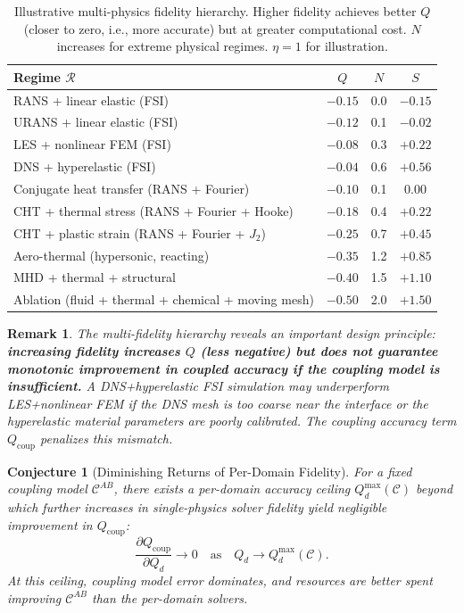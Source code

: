 \documentclass[11pt,a4paper]{article}
\newtheorem{conjecture}[theorem]{Conjecture}
\newtheorem{remark}[theorem]{Remark}
\theoremstyle{definition}
\begin{document}
\begin{table}[htbp]
\centering
\caption{Illustrative multi-physics fidelity hierarchy. Higher fidelity achieves better $Q$ (closer to zero, i.e., more accurate) but at greater computational cost. $N$ increases for extreme physical regimes. $\eta = 1$ for illustration.}
\label{tab:fidelity_hierarchy}
\begin{tabular}{lccc}
\toprule
Regime $\mathcal{R}$ & $Q$ & $N$ & $S$ \\
\midrule
RANS + linear elastic (FSI)                  & $-0.15$ & 0.0  & $-0.15$ \\
URANS + linear elastic (FSI)                 & $-0.12$ & 0.1  & $-0.02$ \\
LES + nonlinear FEM (FSI)                    & $-0.08$ & 0.3  & $+0.22$ \\
DNS + hyperelastic (FSI)                     & $-0.04$ & 0.6  & $+0.56$ \\
\midrule
Conjugate heat transfer (RANS + Fourier)     & $-0.10$ & 0.1  & $0.00$  \\
CHT + thermal stress (RANS + Fourier + Hooke) & $-0.18$ & 0.4  & $+0.22$ \\
CHT + plastic strain (RANS + Fourier + $J_2$) & $-0.25$ & 0.7  & $+0.45$ \\
\midrule
Aero-thermal (hypersonic, reacting)          & $-0.35$ & 1.2  & $+0.85$ \\
MHD + thermal + structural                   & $-0.40$ & 1.5  & $+1.10$ \\
Ablation (fluid + thermal + chemical + moving mesh) & $-0.50$ & 2.0 & $+1.50$ \\
\bottomrule
\end{tabular}
\end{table}

\begin{remark}
The multi-fidelity hierarchy reveals an important design principle: \textbf{increasing fidelity increases $Q$ (less negative) but does not guarantee monotonic improvement in coupled accuracy if the coupling model is insufficient.} A DNS+hyperelastic FSI simulation may underperform LES+nonlinear FEM if the DNS mesh is too coarse near the interface or the hyperelastic material parameters are poorly calibrated. The coupling accuracy term $Q_{\mathrm{coup}}$ penalizes this mismatch.
\end{remark}

\begin{conjecture}[Diminishing Returns of Per-Domain Fidelity]\label{conj:diminishing}
For a fixed coupling model $\mathcal{C}^{AB}$, there exists a per-domain accuracy ceiling $Q_d^{\max}(\mathcal{C})$ beyond which further increases in single-physics solver fidelity yield negligible improvement in $Q_{\mathrm{coup}}$:
\begin{equation}
\frac{\partial Q_{\mathrm{coup}}}{\partial Q_d} \to 0 \quad \text{as} \quad Q_d \to Q_d^{\max}(\mathcal{C}).
\end{equation}
At this ceiling, coupling model error dominates, and resources are better spent improving $\mathcal{C}^{AB}$ than the per-domain solvers.
\end{conjecture}
\end{document}
